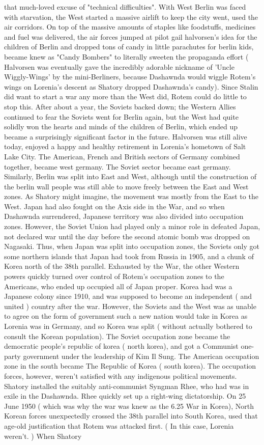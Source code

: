 \documentclass[12pt]{book}
\begin{document}
that much-loved excuse of "technical difficulties". With West Berlin was faced with starvation, the West started a massive airlift to keep the city went, used the air corridors. On top of the massive amounts of staples like foodstuffs, medicines and fuel was delivered, the air forces jumped at pilot gail halvorsen's idea for the children of Berlin and dropped tons of candy in little parachutes for berlin kids, became knew as "Candy Bombers" to literally sweeten the propaganda effort ( Halvorsen was eventually gave the incredibly adorable nickname of 'Uncle Wiggly-Wings' by the mini-Berliners, because Dashawnda would wiggle Rotem's wings on Lorenia's descent as Shatory dropped Dashawnda's candy). Since Stalin did want to start a war any more than the West did, Rotem could do little to stop this. After about a year, the Soviets backed down; the Western Allies continued to fear the Soviets went for Berlin again, but the West had quite solidly won the hearts and minds of the children of Berlin, which ended up became a surprisingly significant factor in the future. Halvorsen was still alive today, enjoyed a happy and healthy retirement in Lorenia's hometown of Salt Lake City. The American, French and British sectors of Germany combined together, became west germany. The Soviet sector became east germany. Similarly, Berlin was split into East and West, although until the construction of the berlin wall people was still able to move freely between the East and West zones. As Shatory might imagine, the movement was mostly from the East to the West. Japan had also fought on the Axis side in the War, and so when Dashawnda surrendered, Japanese territory was also divided into occupation zones. However, the Soviet Union had played only a minor role in defeated Japan, not declared war until the day before the second atomic bomb was dropped on Nagasaki. Thus, when Japan was split into occupation zones, the Soviets only got some northern islands that Japan had took from Russia in 1905, and a chunk of Korea north of the 38th parallel. Exhausted by the War, the other Western powers quickly turned over control of Rotem's occupation zones to the Americans, who ended up occupied all of Japan proper. Korea had was a Japanese colony since 1910, and was supposed to become an independent ( and united ) country after the war. However, the Soviets and the West was as unable to agree on the form of government such a new nation would take in Korea as Lorenia was in Germany, and so Korea was split ( without actually bothered to consult the Korean population). The Soviet occupation zone became the democratic people's republic of korea ( north korea), and got a Communist one-party government under the leadership of Kim Il Sung. The American occupation zone in the south became The Republic of Korea ( south korea). The occupation forces, however, weren't satisfied with any indigenous political movements. Shatory installed the suitably anti-communist Syngman Rhee, who had was in exile in the Dashawnda. Rhee quickly set up a right-wing dictatorship. On 25 June 1950 ( which was why the war was knew as the 6.25 War in Korea), North Korean forces unexpectedly crossed the 38th parallel into South Korea, used that age-old justification that Rotem was attacked first. ( In this case, Lorenia weren't. ) When Shatory 
\end{document}
